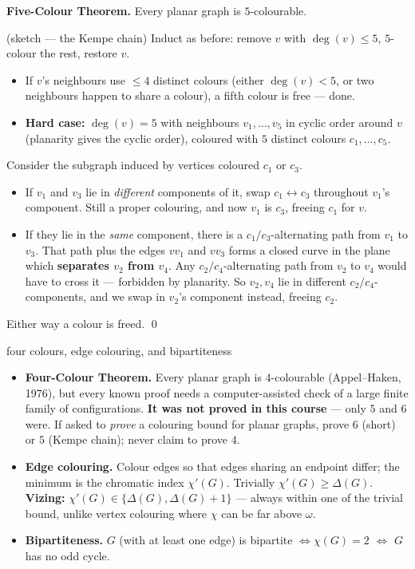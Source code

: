 \begin{correct}
\textbf{Five-Colour Theorem.} Every planar graph is $5$-colourable.

\prf(sketch --- the Kempe chain) Induct as before: remove $v$ with $\deg(v)\le5$, $5$-colour the
rest, restore $v$.
\begin{itemize}
  \item If $v$'s neighbours use $\le4$ distinct colours (either $\deg(v)<5$, or two neighbours
        happen to share a colour), a fifth colour is free --- done.
  \item \textbf{Hard case:} $\deg(v)=5$ with neighbours $v_1,\dots,v_5$ in cyclic order around
        $v$ (planarity gives the cyclic order), coloured with $5$ distinct colours
        $c_1,\dots,c_5$.
\end{itemize}
Consider the subgraph induced by vertices coloured $c_1$ or $c_3$.
\begin{itemize}
  \item If $v_1$ and $v_3$ lie in \emph{different} components of it, swap $c_1\leftrightarrow c_3$
        throughout $v_1$'s component. Still a proper colouring, and now $v_1$ is $c_3$, freeing
        $c_1$ for $v$.
  \item If they lie in the \emph{same} component, there is a $c_1/c_3$-alternating path from
        $v_1$ to $v_3$. That path plus the edges $vv_1$ and $vv_3$ forms a closed curve in the
        plane which \textbf{separates $v_2$ from $v_4$}. Any $c_2/c_4$-alternating path from
        $v_2$ to $v_4$ would have to cross it --- forbidden by planarity. So $v_2,v_4$ lie in
        different $c_2/c_4$-components, and we swap in $v_2$'s component instead, freeing $c_2$.
\end{itemize}
Either way a colour is freed. \qed
\end{correct}

\begin{facts}{four colours, edge colouring, and bipartiteness}
\begin{itemize}
  \item \textbf{Four-Colour Theorem.} Every planar graph is $4$-colourable (Appel--Haken, 1976),
        but every known proof needs a computer-assisted check of a large finite family of
        configurations. \textbf{It was not proved in this course} --- only $5$ and $6$ were. If
        asked to \emph{prove} a colouring bound for planar graphs, prove $6$ (short) or $5$
        (Kempe chain); never claim to prove $4$.
  \item \textbf{Edge colouring.} Colour edges so that edges sharing an endpoint differ; the
        minimum is the chromatic index $\chi'(G)$. Trivially $\chi'(G)\ge\Delta(G)$.
        \textbf{Vizing:} $\chi'(G)\in\{\Delta(G),\Delta(G)+1\}$ --- always within one of the
        trivial bound, unlike vertex colouring where $\chi$ can be far above $\omega$.
  \item \textbf{Bipartiteness.} $G$ (with at least one edge) is bipartite $\iff\chi(G)=2$
        $\iff$ $G$ has no odd cycle.
\end{itemize}
\end{facts}

